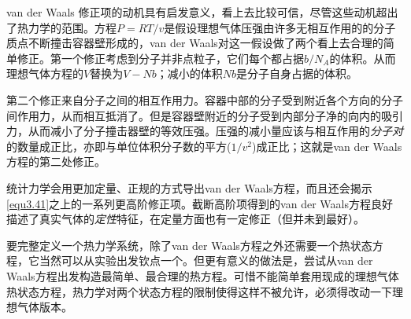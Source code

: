 van der Waals 修正项的动机具有启发意义，看上去比较可信，尽管这些动机超出了热力学的范围。方程$P = RT/v$是假设理想气体压强由许多无相互作用的的分子质点不断撞击容器壁形成的，van der Waals对这一假设做了两个看上去合理的简单修正。第一个修正考虑到分子并非点粒子，它们每个都占据$b/N_A$的体积。从而理想气体方程的$V$替换为$V - Nb$；减小的体积$Nb$是分子自身占据的体积。

第二个修正来自分子之间的相互作用力。容器中部的分子受到附近各个方向的分子间作用力，从而相互抵消了。但是容器壁附近的分子受到内部分子净的向内的吸引力，从而减小了分子撞击器壁的等效压强。压强的减小量应该与相互作用的{\it 分子对}的数量成正比，亦即与单位体积分子数的平方($1/v^2$)成正比；这就是van der Waals方程的第二处修正。

统计力学会用更加定量、正规的方式导出van der Waals方程，而且还会揭示\eqref{equ3.41}之上的一系列更高阶修正项。截断高阶项得到的van der Waals方程良好描述了真实气体的{\it 定性}特征，在定量方面也有一定修正（但并未到最好）。

要完整定义一个热力学系统，除了van der Waals方程之外还需要一个热状态方程，它当然可以从实验出发钦点一个。但更有意义的做法是，尝试从van der Waals方程出发构造最简单、最合理的热方程。可惜不能简单套用现成的理想气体热状态方程，热力学对两个状态方程的限制使得这样不被允许，必须得改动一下理想气体版本。

